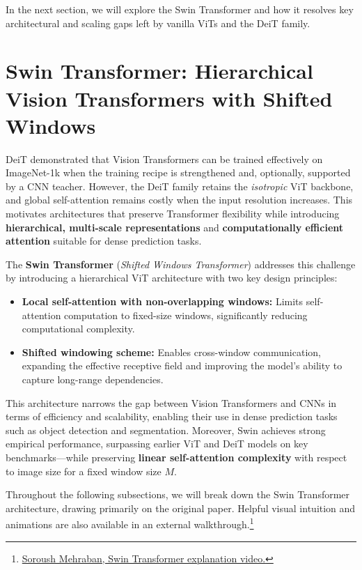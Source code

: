 \noindent
In the next section, we will explore the Swin Transformer
and how it resolves key architectural and scaling gaps left by vanilla ViTs and the DeiT family.

\newpage

\section{Swin Transformer: Hierarchical Vision Transformers with Shifted Windows}
\label{sec:chapter18_swin_intro}

\noindent
DeiT demonstrated that Vision Transformers can be trained effectively on ImageNet-1k when the training recipe is strengthened and, optionally, supported by a CNN teacher.
However, the DeiT family retains the \emph{isotropic} ViT backbone, and global self-attention remains costly when the input resolution increases.
This motivates architectures that preserve Transformer flexibility while introducing \textbf{hierarchical, multi-scale representations} and \textbf{computationally efficient attention} suitable for dense prediction tasks.

\noindent
The \textbf{Swin Transformer} (\emph{Shifted Windows Transformer}) \cite{liu2021_swin} addresses this challenge by introducing a hierarchical ViT architecture with two key design principles:

\begin{itemize}
    \item \textbf{Local self-attention with non-overlapping windows:} Limits self-attention computation to fixed-size windows, significantly reducing computational complexity.
    \item \textbf{Shifted windowing scheme:} Enables cross-window communication, expanding the effective receptive field and improving the model’s ability to capture long-range dependencies.
\end{itemize}

\noindent
This architecture narrows the gap between Vision Transformers and CNNs in terms of efficiency and scalability, enabling their use in dense prediction tasks such as object detection and segmentation. Moreover, Swin achieves strong empirical performance, surpassing earlier ViT and DeiT models on key benchmarks—while preserving \textbf{linear self-attention complexity} with respect to image size for a fixed window size \(M\).

\noindent
Throughout the following subsections, we will break down the Swin Transformer architecture, drawing primarily on the original paper.
Helpful visual intuition and animations are also available in an external walkthrough.\footnote{\href{https://www.youtube.com/watch?v=qUSPbHE3OeU&t=354s&ab_channel=SoroushMehraban}{Soroush Mehraban, Swin Transformer explanation video.}}


